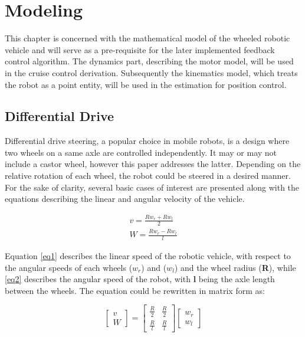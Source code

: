 \chapter{Modeling} \label{ch:modeling}

This chapter is concerned with the mathematical model of the wheeled robotic vehicle and will serve as a pre-requisite for the later implemented feedback control algorithm. 
The dynamics part, describing the motor model, will be used in the cruise control derivation. Subsequently the kinematics model, which treats the robot as a point entity, will be used in the estimation for position control.

\section{Differential Drive} \label{kin_model} 

Differential drive steering, a popular choice in mobile robots, is a design where two wheels on a same axle are controlled independently. It may or may not include a castor wheel, however this paper addresses the latter. Depending on the relative rotation of each wheel, the robot could be steered in a desired manner. For the sake of clarity, several basic cases of interest are presented along with the equations describing the linear and angular velocity of the vehicle. 

\begin{align}
v = \frac{Rw_r + Rw_l}{2} \label{eq1} \\
W = \frac{Rw_r - Rw_l}{l} \label{eq2} 
\end{align}

Equation \ref{eq1} describes the linear speed of the robotic vehicle, with respect to the angular speeds of each wheels (\textbf{$w_r$}) and (\textbf{$w_l$}) and the wheel radius (\textbf{R}), while \ref{eq2} describes the angular speed of the robot, with \textbf{l} being the axle length between the wheels. 
The equation could be rewritten in matrix form as:

\[ \label{eq3} 	
\begin{bmatrix}
	v \\
	W	
\end{bmatrix}
=
\begin{bmatrix} 
	\frac{R}{2} & \frac{R}{2} \\
	\frac{R}{l} & \frac{R}{l} 
\end{bmatrix}
\begin{bmatrix}
	w_r \\
	w_l 
\end{bmatrix}
\] 

